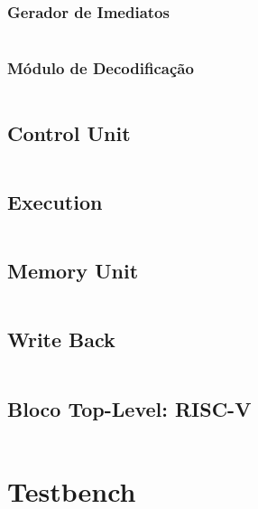 \documentclass[12pt,a4paper,titlepage]{article}
\begin{document}
\clearpage\subsubsection{Gerador de Imediatos}
\inputminted{java}{./code/java/imm_gen.java}

\clearpage\subsubsection{Módulo de Decodificação}
\inputminted{java}{./code/java/id_stage.java}

\clearpage
\subsection{Control Unit}
\inputminted{java}{./code/java/control_unit.java}

\clearpage\subsection{Execution}
\inputminted[fontsize=\small]{java}{./code/java/ex_stage.java}

\subsection{Memory Unit}
\inputminted{java}{./code/java/mem_stage.java}

\subsection{Write Back}
\inputminted{java}{./code/java/wb_stage.java}

\clearpage
\subsection{Bloco Top-Level: RISC-V}
\inputminted[fontsize=\small]{java}{./code/java/riscv_top.java}

\section{Testbench}
\end{document}
